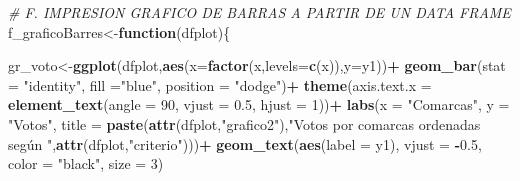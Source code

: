 \documentclass[
]{article}
\newenvironment{Shaded}{\begin{snugshade}}{\end{snugshade}}
\newcommand{\AttributeTok}[1]{\textcolor[rgb]{0.13,0.29,0.53}{#1}}
\newcommand{\CommentTok}[1]{\textcolor[rgb]{0.56,0.35,0.01}{\textit{#1}}}
\newcommand{\ControlFlowTok}[1]{\textcolor[rgb]{0.13,0.29,0.53}{\textbf{#1}}}
\newcommand{\DecValTok}[1]{\textcolor[rgb]{0.00,0.00,0.81}{#1}}
\newcommand{\FloatTok}[1]{\textcolor[rgb]{0.00,0.00,0.81}{#1}}
\newcommand{\FunctionTok}[1]{\textcolor[rgb]{0.13,0.29,0.53}{\textbf{#1}}}
\newcommand{\NormalTok}[1]{#1}
\newcommand{\OtherTok}[1]{\textcolor[rgb]{0.56,0.35,0.01}{#1}}
\newcommand{\SpecialCharTok}[1]{\textcolor[rgb]{0.81,0.36,0.00}{\textbf{#1}}}
\newcommand{\StringTok}[1]{\textcolor[rgb]{0.31,0.60,0.02}{#1}}
\begin{document}
\begin{Shaded}
\begin{Highlighting}[]
\CommentTok{\# F. IMPRESION GRAFICO DE BARRAS A PARTIR DE UN DATA FRAME}
\NormalTok{f\_graficoBarres}\OtherTok{\textless{}{-}}\ControlFlowTok{function}\NormalTok{(dfplot)\{}
 
\NormalTok{gr\_voto}\OtherTok{\textless{}{-}}\FunctionTok{ggplot}\NormalTok{(dfplot,}\FunctionTok{aes}\NormalTok{(}\AttributeTok{x=}\FunctionTok{factor}\NormalTok{(x,}\AttributeTok{levels=}\FunctionTok{c}\NormalTok{(x)),}\AttributeTok{y=}\NormalTok{y1))}\SpecialCharTok{+}
   \FunctionTok{geom\_bar}\NormalTok{(}\AttributeTok{stat =} \StringTok{"identity"}\NormalTok{, }\AttributeTok{fill =}\StringTok{"blue"}\NormalTok{, }\AttributeTok{position =} \StringTok{"dodge"}\NormalTok{)}\SpecialCharTok{+}
   \FunctionTok{theme}\NormalTok{(}\AttributeTok{axis.text.x =} \FunctionTok{element\_text}\NormalTok{(}\AttributeTok{angle =} \DecValTok{90}\NormalTok{, }\AttributeTok{vjust =} \FloatTok{0.5}\NormalTok{, }\AttributeTok{hjust =} \DecValTok{1}\NormalTok{))}\SpecialCharTok{+}
   \FunctionTok{labs}\NormalTok{(}\AttributeTok{x =} \StringTok{"Comarcas"}\NormalTok{, }\AttributeTok{y =} \StringTok{"Votos"}\NormalTok{, }\AttributeTok{title =} \FunctionTok{paste}\NormalTok{(}\FunctionTok{attr}\NormalTok{(dfplot,}\StringTok{"grafico2"}\NormalTok{),}\StringTok{"Votos por comarcas ordenadas según "}\NormalTok{,}\FunctionTok{attr}\NormalTok{(dfplot,}\StringTok{"criterio"}\NormalTok{)))}\SpecialCharTok{+}
   \FunctionTok{geom\_text}\NormalTok{(}\FunctionTok{aes}\NormalTok{(}\AttributeTok{label =}\NormalTok{ y1), }\AttributeTok{vjust =} \SpecialCharTok{{-}}\FloatTok{0.5}\NormalTok{, }\AttributeTok{color =} \StringTok{"black"}\NormalTok{, }\AttributeTok{size =} \DecValTok{3}\NormalTok{) }


\end{Highlighting}
\end{Shaded}
\end{document}
